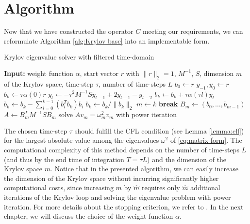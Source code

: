 \documentclass[a4paper,11pt,bibliography=totoc,listof=totoc,headinclude=true,cleardoublepage=empty,oneside]{scrbook}
\begin{document}
\section{Algorithm}
Now that we have constructed the operator $C$ meeting our requirements, we can reformulate Algorithm \ref{alg:Krylov base} into an implementable form.

\begin{algorithm}[H]
\caption{Krylov eigenvalue solver with filtered time-domain}\label{alg:Krylov pro}
   \begin{algorithmic}
        \State \textbf{Input: } weight function $\alpha$, start vector $r$ with $\|r\|_2 = 1$, $M^{-1}$, $S$, dimension $m$ of the Krylov space, time-step $\tau$, number of time-steps $L$
        \State $b_0 \gets r$
            \State $y_{-1}, y_{0} \gets r$
            \State $b_k \gets \tau \alpha(0) r$
                \State $y_l \gets -\tau^2 M^{-1}S y_{l-1} + 2y_{l-1} - y_{l-2}$ 
                \State $b_k \gets b_k + \tau \alpha(\tau l)y_l$ 
            \EndFor
            \State $b_k \gets b_k - \sum_{i=0}^{k-1}(b_i^Tb_k)b_i$ 
                \State $b_k\gets b_k/\|b_k\|_2$ 
            \Else
            \State $m\gets k$   
                \State \textbf{break} 
            \EndIf
        \EndFor
        \State $B_m \gets (b_0, \dots, b_{m-1})$ 
        \State $A \gets B_m^T M^{-1}S B_m$
        \State solve $Av_m = \omega_m^2 v_m$ with power iteration
    \end{algorithmic} 
\end{algorithm}

The chosen time-step $\tau$ should fulfill the CFL condition (see Lemma \ref{lemma:cfl}) for the largest absolute value among the eigenvalues $\omega^2$ of \eqref{eq:matrix form}. The computational complexity of this method depends on the number of time-steps $L$ (and thus by the end time of integration $T = \tau L$) and the dimension of the Krylov space $m$. Notice that in the presented algorithm, we can easily increase the dimension of the Krylov space without incurring significantly higher computational costs, since increasing $m$ by $\hat{m}$ requires only $\hat{m}$ additional iterations of the Krylov loop and solving the eigenvalue problem with power iteration. For more details about the stopping criterion, we refer to \cite[p. 8--9]{nannen}. In the next chapter, we will discuss the choice of the weight function $\alpha$.
\end{document}

